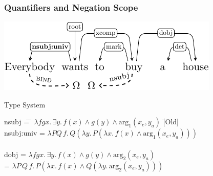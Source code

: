 \documentclass[mathserif,12pt]{beamer}
\renewcommand{\land}{\wedge}
\newcommand{\lspace}{.\,}
\begin{document}
\begin{frame}
\frametitle{Quantifiers and Negation Scope}
\centering
\includegraphics[trim=0em 0em 0em 0em,clip=true,scale=1.1]{figures/everybody-wants-buy-house-enhanced-with-univ-crop}

\begin{block}{\large Type System}
\large
\begin{tabbing}
nsubj \hspace{2em} \= =  \= $\lambda f g x\lspace \exists y\lspace f(x) \land g(y) \land \mathrm{arg_1}(x_e, y_a)$ \hspace{2.6em} \=  [Old]\\
nsubj:univ \> = \> $\lambda P Q\, f \lspace Q(\lambda y \lspace P (\lambda x \lspace f(x)  \land \mathrm{arg_1}(x_e,y_a)))$ \> [New]  \\

\\

dobj \> = \> $\lambda f g x\lspace \exists y\lspace f(x) \land g(y) \land \mathrm{arg_2}(x_e, y_a)$ \> [Old] \\
\> = \> $ \lambda P\, Q\, f \lspace P(\lambda x \lspace f(x) \land  Q(\lambda y \lspace \mathrm{arg_2}(x_e,y_a))) $ \> [New] 

\end{tabbing}
\end{block}
\end{frame} 
\end{document}

